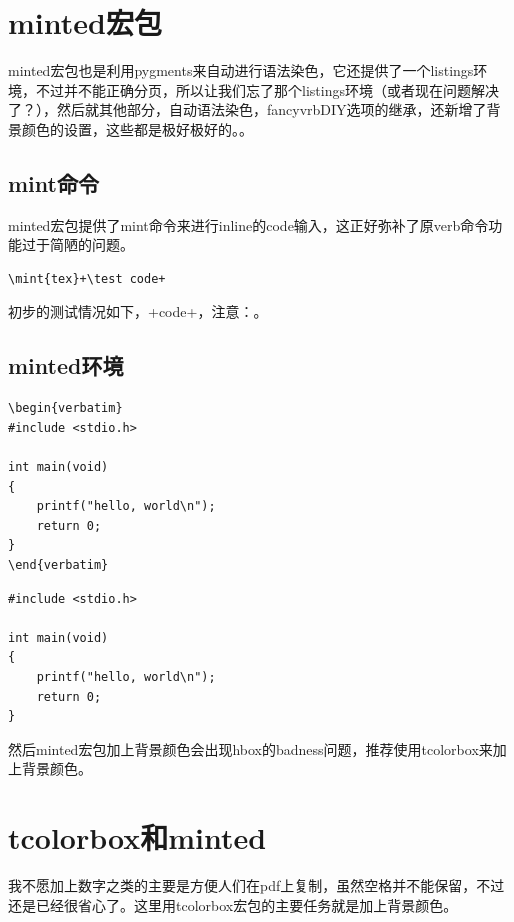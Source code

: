 \documentclass[11pt,oneside]{book}
\begin{document}
\section{minted宏包}
minted宏包也是利用pygments来自动进行语法染色，它还提供了一个listings环境，不过并不能正确分页，所以让我们忘了那个listings环境（或者现在问题解决了？），然后就其他部分，自动语法染色，fancyvrbDIY选项的继承，还新增了背景颜色的设置，这些都是极好极好的。。

\subsection{mint命令}
minted宏包提供了mint命令来进行inline的code输入，这正好弥补了原verb命令功能过于简陋的问题。

\begin{Verbatim}
\mint{tex}+\test code+
\end{Verbatim}

初步的测试情况如下，+\test code+，注意：。

\subsection{minted环境}
\begin{Verbatim}
\begin{verbatim}
#include <stdio.h>

int main(void)
{
    printf("hello, world\n");
    return 0;
}
\end{verbatim}
\end{Verbatim}

\begin{verbatim}
#include <stdio.h>

int main(void)
{
    printf("hello, world\n");
    return 0;
}
\end{verbatim}

然后minted宏包加上背景颜色会出现hbox的badness问题，推荐使用tcolorbox来加上背景颜色。


\section{tcolorbox和minted}
我不愿加上数字之类的主要是方便人们在pdf上复制，虽然空格并不能保留，不过还是已经很省心了。这里用tcolorbox宏包的主要任务就是加上背景颜色。
\end{document}
